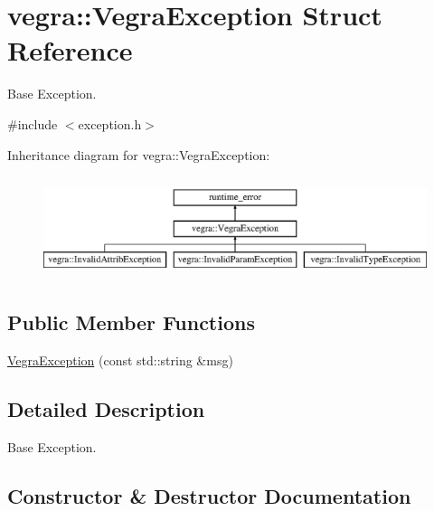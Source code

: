 \hypertarget{structvegra_1_1VegraException}{}\section{vegra\+:\+:Vegra\+Exception Struct Reference}
\label{structvegra_1_1VegraException}


Base Exception.  




{\ttfamily \#include $<$exception.\+h$>$}

Inheritance diagram for vegra\+:\+:Vegra\+Exception\+:\begin{figure}[H]
\begin{center}
\leavevmode
\includegraphics[height=2.994653cm]{structvegra_1_1VegraException}
\end{center}
\end{figure}
\subsection*{Public Member Functions}
\begin{DoxyCompactItemize}
\item 
\mbox{\hyperlink{structvegra_1_1VegraException_a1a020e0b31f096861f1cc79f78c02706}{Vegra\+Exception}} (const std\+::string \&msg)
\end{DoxyCompactItemize}


\subsection{Detailed Description}
Base Exception. 

\subsection{Constructor \& Destructor Documentation}
\mbox{\label{structvegra_1_1VegraException_a1a020e0b31f096861f1cc79f78c02706}} 
